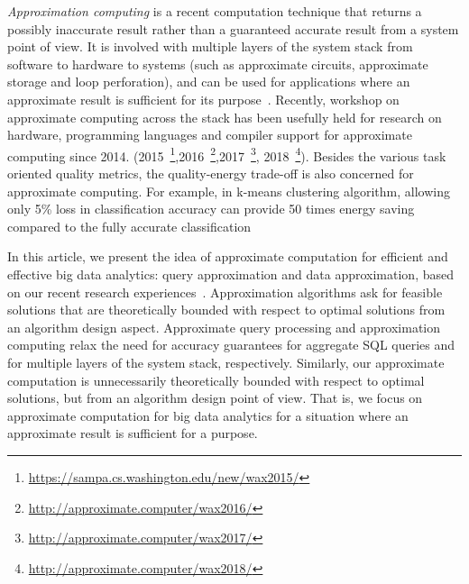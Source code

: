 \item[(3)] {\em Approximation computing} is a recent computation technique that returns a possibly inaccurate result rather than a guaranteed accurate result from a system point of view.  It is involved with multiple layers of the system stack from software to hardware to systems (such as approximate circuits, approximate storage and loop perforation), and can be used for applications where an approximate result is sufficient for its purpose~\cite{AgrawalCGGNOPSS16,Mittal16b}. Recently, workshop on approximate computing across the stack has been usefully held for research on hardware, programming languages and compiler support  for approximate computing  since 2014.  (2015~\footnote{\small \url{https://sampa.cs.washington.edu/new/wax2015/}},2016~\footnote{\small \url{http://approximate.computer/wax2016/}},2017~\footnote{\small  \url{http://approximate.computer/wax2017/}}, 2018~\footnote{\small  \url{http://approximate.computer/wax2018/}}). Besides the various task oriented quality metrics,  the quality-energy trade-off is also  concerned for approximate computing. For example, in k-means clustering algorithm, allowing only 5\% loss in classification accuracy can provide 50 times energy saving compared to the fully accurate classification~\cite{Mittal16b}
\ei

In this article, we present the idea of approximate computation for efficient and effective big data analytics: query approximation and data approximation, based on our recent research experiences~\cite{MaCHW12,ShuaiMaVLDB12,tods-MaCFHW14,LinMZWH17,MaHWLH17,MaFLWCH16,MaFLWCH17,HuAMH16,DuanAMHH16,DuanMAMH17,rankicde2018}.
Approximation algorithms ask for feasible solutions that are theoretically bounded with respect to optimal solutions from an algorithm design aspect.
Approximate query processing and approximation computing relax the need for accuracy guarantees for aggregate SQL queries and for multiple layers of the system stack, respectively. Similarly, our approximate computation is unnecessarily theoretically bounded with respect to optimal solutions, but from an algorithm design point of view. That is, we focus on approximate computation for big data analytics for a situation where an approximate result is sufficient for a purpose.





